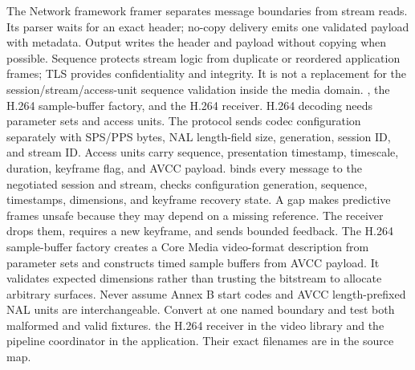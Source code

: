 {}The Network framework framer separates message boundaries from stream reads. Its parser waits for an exact header; no-copy delivery emits one validated payload with metadata. Output writes the header and payload without copying when possible.\markdownRendererParagraphSeparator
{}Sequence protects stream logic from duplicate or reordered application frames; TLS provides confidentiality and integrity. It is not a replacement for the session/stream/access-unit sequence validation inside the media domain.\markdownRendererInterblockSeparator
{}
\markdownRendererSectionEnd \markdownRendererSectionBegin
{}\markdownRendererInterblockSeparator
{}\markdownRendererBlockQuoteBegin
{} , the H.264 sample-buffer factory, and the H.264 receiver.\markdownRendererBlockQuoteEnd \markdownRendererInterblockSeparator
{}H.264 decoding needs parameter sets and access units. The protocol sends codec configuration separately with SPS/PPS bytes, NAL length-field size, generation, session ID, and stream ID. Access units carry sequence, presentation timestamp, timescale, duration, keyframe flag, and AVCC payload.\markdownRendererParagraphSeparator
{} binds every message to the negotiated session and stream, checks configuration generation, sequence, timestamps, dimensions, and keyframe recovery state. A gap makes predictive frames unsafe because they may depend on a missing reference. The receiver drops them, requires a new keyframe, and sends bounded feedback.\markdownRendererParagraphSeparator
{}The H.264 sample-buffer factory creates a Core Media video-format description from parameter sets and constructs timed sample buffers from AVCC payload. It validates expected dimensions rather than trusting the bitstream to allocate arbitrary surfaces.\markdownRendererParagraphSeparator
{}Never assume Annex B start codes and AVCC length-prefixed NAL units are interchangeable. Convert at one named boundary and test both malformed and valid fixtures.\markdownRendererInterblockSeparator
{}
\markdownRendererSectionEnd \markdownRendererSectionBegin
{}\markdownRendererInterblockSeparator
{}\markdownRendererBlockQuoteBegin
{} the H.264 receiver in the video library and the pipeline coordinator in the application. Their exact filenames are in the source map.\markdownRendererBlockQuoteEnd \markdownRendererInterblockSeparator
